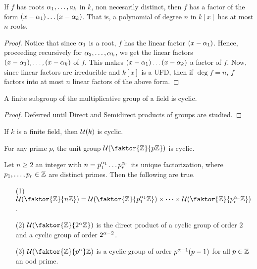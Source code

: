 \begin{theorem}\label{lemma_7.4.4}
  If $f$ has roots  $\alpha_1, \dots, a_k$ in $k$, non necesarily distinct, then
  $f$ has a factor of the form $(x-\alpha_1) \dots (x-\alpha_k)$. That is, a
  polynomial of degree $n$ in  $k[x]$ has at most $n$ roots.
\end{theorem}
\begin{proof}
  Notice that since $\alpha_1$ is a root, $f$ has the linear factor  $(x-\alpha_1)$.
  Hence, proceeding recursively for $\alpha_2, \dots, \alpha_k$, we get the linear
  factors $(x-\alpha_1), \dots, (x-\alpha_k)$ of $f$. This makes  $(x-\alpha_1) \dots
  (x-\alpha_k)$ a factor of $f$. Now, since linear factors are irreducible and
  $k[x]$ is a UFD, then if $\deg{f}=n$, $f$ factors into at most  $n$ linear
  factors of the above form.
\end{proof}

\begin{lemma}\label{lemma_7.4.5}
  A finite subgroup of the multiplicative group of a field is cyclic.
\end{lemma}
\begin{proof}
  Deferred until Direct and Semidirect products of groups are studied.
\end{proof}
\begin{corollary}
  If $k$ is a finite field, then  $\mathcal{U}(k)$ is cyclic.
\end{corollary}
\begin{corollary}
  For any prime $p$, the unit group  $\Uc(\faktor{\Z}{p\Z})$ is cyclic.
\end{corollary}
\begin{corollary}
  Let $n \geq 2$ an integer with  $n=p_1^{\alpha_1} \dots p_r^{\alpha_r}$ its unique
  factorization, where $p_1, \dots, p_r \in \mathbb{Z}$ are distinct primes. Then the
  following are true.
  \begin{enumerate}
    \item[(1)] $\Uc(\faktor{\Z}{n\Z})=\Uc(\faktor{\Z}{p_1^{\a_1}\Z}) \times
      \dots \times \Uc(\faktor{\Z}{p_r^{\a_r}\Z})$.

    \item[(2)] $\Uc(\faktor{\Z}{2^\a\Z})$ is the direct product of a cyclic
      group of order $2$ and a cyclic group of order $2^{\alpha-2}$.

    \item[(3)] $\Uc(\faktor{\Z}{p^\a}\Z)$ is a cyclic group of order
      $p^{\alpha-1}(p-1)$ for all $p \in \mathbb{Z}$ an ood prime.
  \end{enumerate}
\end{corollary}
